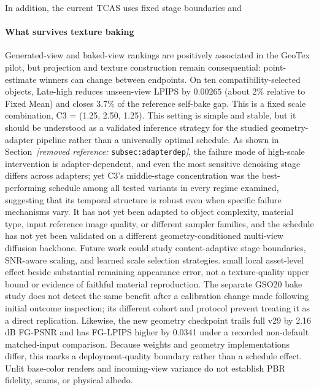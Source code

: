 \documentclass[times,twocolumn,final]{elsarticle}
\providecommand{\DIFadd}[1]{{\protect\color{blue} \sf #1}} %
\providecommand{\DIFdel}[1]{{\protect\color{red} \scriptsize #1}} %
\providecommand{\DIFaddbegin}{} %
\providecommand{\DIFaddend}{} %
\providecommand{\DIFdelbegin}{} %
\providecommand{\DIFdelend}{} %
\begin{document}
\DIFdelbegin \DIFdel{In addition, the current TCAS uses fixed stage boundaries and }\DIFdelend \DIFaddbegin \paragraph{What survives texture baking}
\DIFadd{Generated-view and baked-view rankings are positively associated in the GeoTex pilot, but projection and texture construction remain consequential: point-estimate winners can change between endpoints. On ten compatibility-selected objects, Late-high reduces unseen-view LPIPS by $0.00265$ (about 2\% relative to Fixed Mean) and closes 3.7\% of the reference self-bake gap. This is }\DIFaddend a \DIFdelbegin \DIFdel{fixed scale combination, C3 = (1.25, 2.50, 1.25). This setting is simple and stable, but it should be understood as a validated inference strategy for the studied geometry-adapter pipeline rather than a universally optimal schedule. As shown in Section~\textit{[removed reference: }\texttt{subsec:adapterdep}\textit{]}, the failure mode of high-scale intervention is adapter-dependent, and even the most sensitive denoising stage differs across adapters; yet C3's middle-stage concentration was the best-performing schedule among all tested variants in every regime examined, suggesting that its temporal structure is robust even when specific failure mechanisms vary. It has not yet been adapted to object complexity, material type, input reference image quality, or different sampler families, and the schedule has not yet been validated on a different geometry-conditioned multi-view diffusion backbone. Future work could study content-adaptive stage boundaries, SNR-aware scaling, and learned scale selection strategies. }\DIFdelend \DIFaddbegin \DIFadd{small local asset-level effect beside substantial remaining appearance error, not a texture-quality upper bound or evidence of faithful material reproduction. The separate GSO20 bake study does not detect the same benefit after a calibration change made following initial outcome inspection; its different cohort and protocol prevent treating it as a direct replication. Likewise, the new geometry checkpoint trails full v29 by 2.16 dB FG-PSNR and has FG-LPIPS higher by 0.0341 under a recorded non-default matched-input comparison. Because weights and geometry implementations differ, this marks a deployment-quality boundary rather than a schedule effect. Unlit base-color renders and incoming-view variance do not establish PBR fidelity, seams, or physical albedo.
}\DIFaddend
\end{document}
